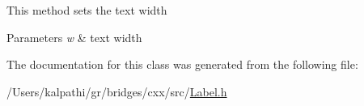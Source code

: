 This method sets the text width


\begin{DoxyParams}{Parameters}
{\em w} & text width \\
\hline
\end{DoxyParams}


The documentation for this class was generated from the following file\+:\begin{DoxyCompactItemize}
\item 
/\+Users/kalpathi/gr/bridges/cxx/src/\mbox{\hyperlink{_label_8h}{Label.\+h}}\end{DoxyCompactItemize}
